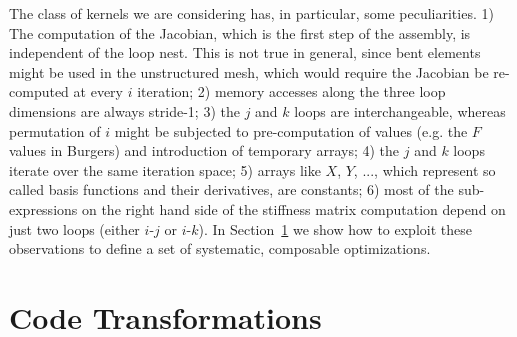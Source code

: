 \documentclass[conference]{IEEEtran}
\begin{document}
The class of kernels we are considering has, in particular, some peculiarities. 1) The computation of the Jacobian, which is the first step of the assembly, is independent of the loop nest. This is not true in general, since bent elements might be used in the unstructured mesh, which would require the Jacobian be re-computed at every $i$ iteration; 2) memory accesses along the three loop dimensions are always stride-1; 3) the $j$ and $k$ loops are interchangeable, whereas permutation of $i$ might be subjected to pre-computation of values (e.g. the $F$ values in Burgers) and introduction of temporary arrays; 4) the $j$ and $k$ loops iterate over the same iteration space; 5) arrays like $X$, $Y$, ..., which represent so called basis functions and their derivatives, are constants; 6) most of the sub-expressions on the right hand side of the stiffness matrix computation depend on just two loops (either $i$-$j$ or $i$-$k$). In Section~\ref{sec:code-transf} we show how to exploit these observations to define a set of systematic, composable optimizations.


\section{Code Transformations}
\label{sec:code-transf}
\end{document}
